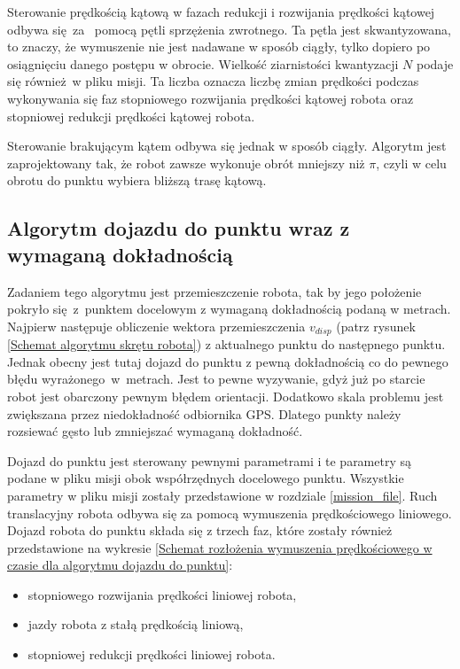 {{        Sterowanie prędkością kątową w fazach redukcji i rozwijania prędkości kątowej odbywa się~za~ pomocą pętli sprzężenia zwrotnego. Ta pętla jest skwantyzowana, to znaczy, że wymuszenie nie jest nadawane w sposób ciągły, tylko dopiero po osiągnięciu danego postępu w obrocie. Wielkość ziarnistości kwantyzacji $N$ podaje się również w pliku misji. Ta liczba oznacza liczbę zmian prędkości podczas wykonywania się faz stopniowego rozwijania prędkości kątowej robota oraz stopniowej redukcji prędkości kątowej robota.
        
        Sterowanie brakującym kątem odbywa się jednak w sposób ciągły. 
        Algorytm jest zaprojektowany tak, że robot zawsze wykonuje obrót mniejszy niż $\pi$, czyli w celu obrotu do punktu wybiera bliższą trasę kątową.
    }
    \subsection{Algorytm dojazdu do punktu wraz z wymaganą dokładnością}
    {
        \label{disp_algorithm}
        Zadaniem tego algorytmu jest przemieszczenie robota, tak by jego położenie pokryło się~z~punktem docelowym z wymaganą dokładnością podaną w metrach.
        Najpierw następuje obliczenie wektora przemieszczenia $v_{disp}$ (patrz rysunek \ref{Schemat algorytmu skrętu robota}) z aktualnego punktu do następnego punktu. Jednak obecny jest tutaj dojazd do punktu z pewną dokładnością co do pewnego błędu wyrażonego~w~metrach. Jest to pewne wyzywanie, gdyż już po starcie robot jest obarczony pewnym błędem orientacji. Dodatkowo skala problemu jest zwiększana przez niedokładność odbiornika GPS. Dlatego punkty należy rozsiewać gęsto lub zmniejszać wymaganą dokładność.

        Dojazd do punktu jest sterowany pewnymi parametrami i te parametry są podane w pliku misji obok współrzędnych docelowego punktu. Wszystkie parametry w pliku misji zostały przedstawione w rozdziale \ref{mission_file}. Ruch translacyjny robota odbywa się za pomocą wymuszenia prędkościowego liniowego. Dojazd robota do punktu składa się z trzech faz, które zostały również przedstawione na wykresie \ref{Schemat rozłożenia wymuszenia prędkościowego w czasie dla algorytmu dojazdu do punktu}:

        \begin{itemize}
            \item stopniowego rozwijania prędkości liniowej robota,
            \item jazdy robota z stałą prędkością liniową,
            \item stopniowej redukcji prędkości liniowej robota.
        \end{itemize}

}}
